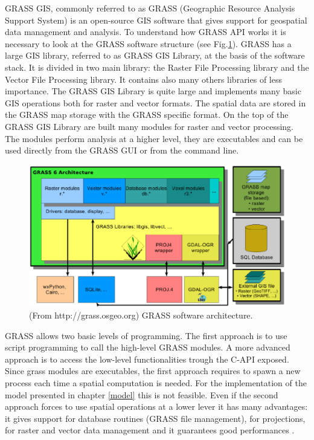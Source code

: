 \documentclass[12pt,a4paper,twoside]{book}
\begin{document}
GRASS GIS, commonly referred to as GRASS (Geographic Resource Analysis Support System) is an open-source GIS software that gives support for geospatial data management and analysis. To understand how GRASS API works it is necessary to look at the GRASS software structure (see Fig.\ref{grass_structure}). GRASS has a large GIS library, referred to as GRASS GIS Library, at the basis of the software stack. It is divided in two main library: the Raster File Processing library and the Vector File Processing library. It contains also many others libraries of less importance. The GRASS GIS Library is quite large and implements many basic GIS operations both for raster and vector formats. The spatial data are stored in the GRASS map storage with the GRASS specific format. On the top of the GRASS GIS Library are built many modules for raster and vector processing. The modules perform analysis at a higher level, they are executables and can be used directly from the GRASS GUI or from the command line.

\begin{figure}
  \begin{center}
    \includegraphics[width=\textwidth]{images/grass6_arch.eps}
    \caption{(From http://grass.osgeo.org) GRASS software architecture.}\label{grass_structure}
  \end{center}
\end{figure}

GRASS allows two basic levels of programming. The first approach is to use script programming to call the high-level GRASS modules. A more advanced approach is to access the low-level functionalities trough the C-API exposed. Since grass modules are executables, the first approach requires to spawn a new process each time a spatial computation is needed. For the implementation of the model presented in chapter \ref{model} this is not feasible. Even if the second approach forces to use spatial operations at a lower lever it has many advantages: it gives support for database routines (GRASS file management), for projections, for raster and  vector data management and it guarantees good performances \cite{net2008}.
\end{document}
